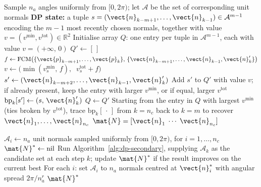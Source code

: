 \begin{algorithm}
\caption{DP path planner — with secondary optimisation goal (maximises PFCM, breaks ties by total FCM)}
\label{alg:dp-secondary}
\begin{algorithmic}
\State Sample $n_a$ angles uniformly from $[0,2\pi)$; let $\mathcal{A}$ be the set of corresponding unit normals
\State \textbf{DP state:} a tuple $s=(\vect{n}_{k-m+1},\ldots,\vect{n}_{k-1})\in\mathcal{A}^{m-1}$ encoding the $m{-}1$ most recently chosen normals, together with value $v=(v^{\min},v^{\mathrm{tot}})\in\mathbb{R}^2$
\State Initialise array $Q$: one entry per tuple in $\mathcal{A}^{m-1}$, each with value $v=(+\infty,\,0)$
  \State $Q'\gets[\,]$
     
      \State $f\gets\mathrm{FCM}\!\left(\{\vect{p}_{k-m+1},\ldots,\vect{p}_k\},\,\{\vect{n}_{k-m+1},\ldots,\vect{n}_{k-1},\vect{n}'_k\}\right)$
        \State $v\gets\bigl(\min(v_s^{\min},\,f),\;\;v_s^{\mathrm{tot}}+f\bigr)$
        \State $s'\gets(\vect{n}_{k-m+2},\ldots,\vect{n}_{k-1},\vect{n}'_k)$ 
        \State Add $s'$ to $Q'$ with value $v$; if already present, keep the entry with larger $v^{\min}$, or if equal, larger $v^{\mathrm{tot}}$
        \State $\mathrm{bp}_k[s'] \gets (s,\,\vect{n}'_k)$ 
      \EndIf
    \EndFor
  \EndFor
  \State $Q\gets Q'$
\EndFor
\State Starting from the entry in $Q$ with largest $v^{\min}$ (ties broken by $v^{\mathrm{tot}}$), trace $\mathrm{bp}_k[\,\cdot\,]$ from $k=n_c$ back to $k=m$ to recover $\vect{n}_1,\ldots,\vect{n}_{n_c}$
\State \Return $\mat{N}=[\vect{n}_1\;\cdots\;\vect{n}_{n_c}]$
\end{algorithmic}
\end{algorithm}

\begin{algorithm}
\caption{DP path planner — with secondary goal and iterative refinement}
\label{alg:dp-refined}
\begin{algorithmic}
\State $\mathcal{A}_i\gets n_a$ unit normals sampled uniformly from $[0,2\pi)$, for $i=1,\ldots,n_c$
\State $\mat{N}^*\gets\mathrm{nil}$
  \State Run Algorithm~\ref{alg:dp-secondary}, supplying $\mathcal{A}_k$ as the candidate set at each step $k$; update $\mat{N}^*$ if the result improves on the current best
  \State For each $i$: set $\mathcal{A}_i$ to $n_a$ normals centred at $\vect{n}_i^*$ with angular spread $2\pi/n_a^r$
\EndFor
\State \Return $\mat{N}^*$
\end{algorithmic}
\end{algorithm}
